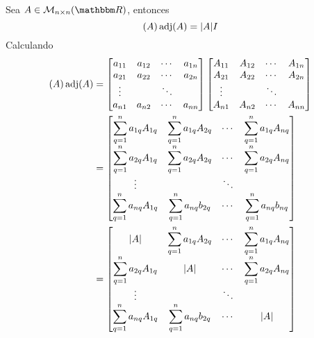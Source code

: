 \begin{theorem}\label{propi:adjuntoid}
    Sea $A \in \mathcal{M}_{n \times n}(\RR)$, entonces
    $$(A) \operatorname{adj}(A) = |A|I$$\newpage
    \demostracion
    Calculando
    \begin{align*}
        (A) \operatorname{adj}(A) & = \begin{bmatrix}
            a_{11} & a_{12} & \cdots & a_{1n}\\
            a_{21} & a_{22} & \cdots & a_{2n}\\
            \vdots &  & \ddots & \\
            a_{n1} & a_{n2} & \cdots & a_{nn}
        \end{bmatrix} \begin{bmatrix}
            A_{11} & A_{12} & \cdots & A_{1n}\\
            A_{21} & A_{22} & \cdots & A_{2n}\\
            \vdots &  & \ddots & \\
            A_{n1} & A_{n2} & \cdots & A_{nn}
        \end{bmatrix} \\
        & = \begin{bmatrix}
            \displaystyle\sum_{q=1}^{n} a_{1q}A_{1q} & \displaystyle\sum_{q=1}^{n} a_{1q}A_{2q} & \cdots & \displaystyle\sum_{q=1}^{n} a_{1q}A_{nq} \\
            \displaystyle\sum_{q=1}^{n} a_{2q}A_{1q} & \displaystyle\sum_{q=1}^{n} a_{2q}A_{2q} & \cdots & \displaystyle\sum_{q=1}^{n} a_{2q}A_{nq} \\
            \vdots & & \ddots & \\
            \displaystyle\sum_{q=1}^{n} a_{nq}A_{1q} & \displaystyle\sum_{q=1}^{n} a_{nq}b_{2q} & \cdots & \displaystyle\sum_{q=1}^{n} a_{nq}b_{nq}
        \end{bmatrix} \\
        & = \begin{bmatrix}
            |A| & \displaystyle\sum_{q=1}^{n} a_{1q}A_{2q} & \cdots & \displaystyle\sum_{q=1}^{n} a_{1q}A_{nq} \\
            \displaystyle\sum_{q=1}^{n} a_{2q}A_{1q} & |A| & \cdots & \displaystyle\sum_{q=1}^{n} a_{2q}A_{nq} \\
            \vdots & & \ddots & \\
            \displaystyle\sum_{q=1}^{n} a_{nq}A_{1q} & \displaystyle\sum_{q=1}^{n} a_{nq}b_{2q} & \cdots & |A|
        \end{bmatrix}
    \end{align*}

\end{theorem}
